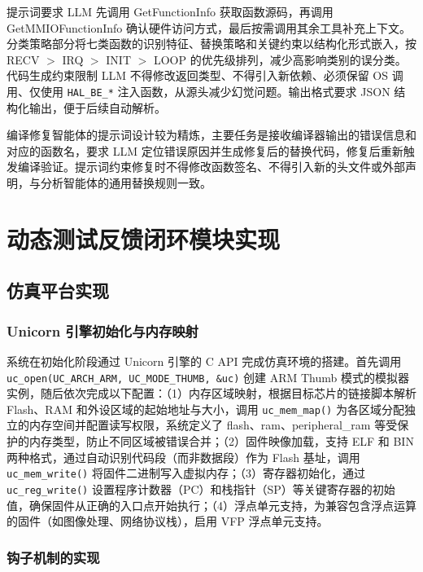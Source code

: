 提示词要求 LLM 先调用 GetFunctionInfo 获取函数源码，再调用 GetMMIOFunctionInfo 确认硬件访问方式，最后按需调用其余工具补充上下文。分类策略部分将七类函数的识别特征、替换策略和关键约束以结构化形式嵌入，按 RECV $>$ IRQ $>$ INIT $>$ LOOP 的优先级排列，减少高影响类别的误分类。代码生成约束限制 LLM 不得修改返回类型、不得引入新依赖、必须保留 OS 调用、仅使用 \texttt{HAL\_BE\_*} 注入函数，从源头减少幻觉问题。输出格式要求 JSON 结构化输出，便于后续自动解析。

编译修复智能体的提示词设计较为精炼，主要任务是接收编译器输出的错误信息和对应的函数名，要求 LLM 定位错误原因并生成修复后的替换代码，修复后重新触发编译验证。提示词约束修复时不得修改函数签名、不得引入新的头文件或外部声明，与分析智能体的通用替换规则一致。

\section{动态测试反馈闭环模块实现}

\subsection{仿真平台实现}

\subsubsection{Unicorn 引擎初始化与内存映射}

系统在初始化阶段通过 Unicorn 引擎的 C API 完成仿真环境的搭建。首先调用 \texttt{uc\_open(UC\_ARCH\_ARM, UC\_MODE\_THUMB, \&uc)} 创建 ARM Thumb 模式的模拟器实例，随后依次完成以下配置：（1）内存区域映射，根据目标芯片的链接脚本解析 Flash、RAM 和外设区域的起始地址与大小，调用 \texttt{uc\_mem\_map()} 为各区域分配独立的内存空间并配置读写权限，系统定义了 flash、ram、peripheral\_ram 等受保护的内存类型，防止不同区域被错误合并；（2）固件映像加载，支持 ELF 和 BIN 两种格式，通过自动识别代码段（而非数据段）作为 Flash 基址，调用 \texttt{uc\_mem\_write()} 将固件二进制写入虚拟内存；（3）寄存器初始化，通过 \texttt{uc\_reg\_write()} 设置程序计数器（PC）和栈指针（SP）等关键寄存器的初始值，确保固件从正确的入口点开始执行；（4）浮点单元支持，为兼容包含浮点运算的固件（如图像处理、网络协议栈），启用 VFP 浮点单元支持。

\subsubsection{钩子机制的实现}
\label{sec:hook-mechanism}

